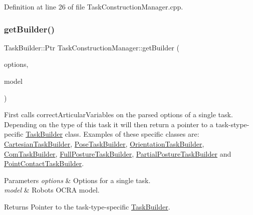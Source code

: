Definition at line 26 of file Task\+Construction\+Manager.\+cpp.

\hypertarget{classocra_1_1TaskConstructionManager_a5fac8f2d0057aba4856a7c7fd280eb92}{}\label{classocra_1_1TaskConstructionManager_a5fac8f2d0057aba4856a7c7fd280eb92} 
\subsubsection{\texorpdfstring{get\+Builder()}{getBuilder()}}
{\footnotesize\ttfamily Task\+Builder\+::\+Ptr Task\+Construction\+Manager\+::get\+Builder (\begin{DoxyParamCaption}\item[{\hyperlink{classocra_1_1TaskBuilderOptions}{Task\+Builder\+Options}}]{options,  }\item[{Model\+::\+Ptr}]{model }\end{DoxyParamCaption})}

First calls correct\+Articular\+Variables on the parsed options of a single task. Depending on the type of this task it will then return a pointer to a task-\/stype-\/pecific \hyperlink{classocra_1_1TaskBuilder}{Task\+Builder} class. Examples of these specific classes are\+: \hyperlink{classocra_1_1CartesianTaskBuilder}{Cartesian\+Task\+Builder}, \hyperlink{classocra_1_1PoseTaskBuilder}{Pose\+Task\+Builder}, \hyperlink{classocra_1_1OrientationTaskBuilder}{Orientation\+Task\+Builder}, \hyperlink{classocra_1_1ComTaskBuilder}{Com\+Task\+Builder}, \hyperlink{classocra_1_1FullPostureTaskBuilder}{Full\+Posture\+Task\+Builder}, \hyperlink{classocra_1_1PartialPostureTaskBuilder}{Partial\+Posture\+Task\+Builder} and \hyperlink{classocra_1_1PointContactTaskBuilder}{Point\+Contact\+Task\+Builder}.


\begin{DoxyParams}{Parameters}
{\em options} & Options for a single task. \\
\hline
{\em model} & Robot\textquotesingle{}s O\+C\+RA model.\\
\hline
\end{DoxyParams}
\begin{DoxyReturn}{Returns}
Pointer to the task-\/type-\/specific \hyperlink{classocra_1_1TaskBuilder}{Task\+Builder}. 
\end{DoxyReturn}


